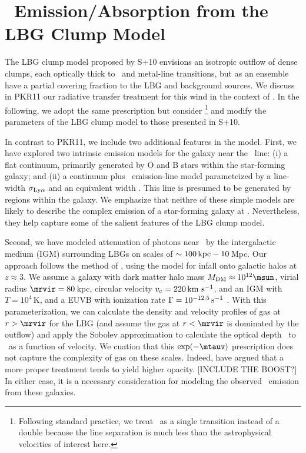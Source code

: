 \documentclass[12pt,preprint]{aastex}
\begin{document}
\section{\lya\ Emission/Absorption from the LBG Clump Model}
\label{sec:lya}

The LBG clump model proposed by S+10 envisions an isotropic outflow of
dense clumps, each optically thick to \lya\ and metal-line
transitions, but as an ensemble have a partial covering fraction to
the LBG and background sources.  We discuss in PKR11 our radiative
transfer treatment for this wind in the context of \mgiid.  In the
following, we adopt the same prescription but consider
\lya\footnote{Following standard practice, we treat \lya\ as a single
  transition instead of a double because the line separation is much less
  than the astrophysical velocities of interest here.}
and modify the parameters of the LBG clump model to those presented in
S+10. 

In contrast to PKR11, we include two additional features in the
model.  First, we have explored two intrinsic emission models for the
galaxy near the \lya\ line: 
(i) a flat continuum, primarily generated by O and B stars within the
star-forming galaxy; and
(ii) a continuum plus \lya\ emission-line model parameteized by a
line-width $\sigma_{\rm Ly\alpha}$ and an equivalent width \wlya.
This line is presumed to be generated by  regions within the
galaxy.  We emphasize that neithre of these simple models are likely
to describe the complex emission of a star-forming galaxy at \lya.
Nevertheless, they help capture some of the salient features of the
LBG clump model.

Second, we have modeled attenuation of photons near \lya\ by the
intergalactic medium (IGM) surrounding LBGs on scales of $\sim 100\,
{\rm kpc} - 10$\,Mpc.  Our approach follows the method of
\cite{santos04}, using the \cite{barkana04} model for infall onto
galactic halos at $z \approx 3$.  We assume a galaxy with dark matter
halo mass $M_{\rm DM} \approx 10^{12} \msun$, virial radius $\mrvir 
= 80$\,kpc, circular velocity $v_{\rm c} = 220 \, {\rm km~s^{-1}}$, and an
IGM with $T = 10^4$\,K, and a EUVB with ionization rate $\Gamma =
10^{-12.5} \, \rm s^{-1}$ \citep{fpl+08}.  With this parameterization,
we can calculate the density and velocity profiles of gas at $r >
\mrvir$ for the LBG (and assume the gas at $r<\mrvir$ is dominated by
the outflow) and apply the Sobolev approximation to calculate the
optical depth \tauv\ to \lya\ as a function of velocity.  We cuation that
this $\exp(-\mtauv)$ prescription does not capture the complexity of
gas on these scales.  Indeed, \cite{zheng10a} have argued that a more
proper treatment tends to yield higher opacity.
[INCLUDE THE BOOST?]
In either case, it is a necessary consideration for modeling the
observed \lya\ emission from these galaxies.
\end{document}
